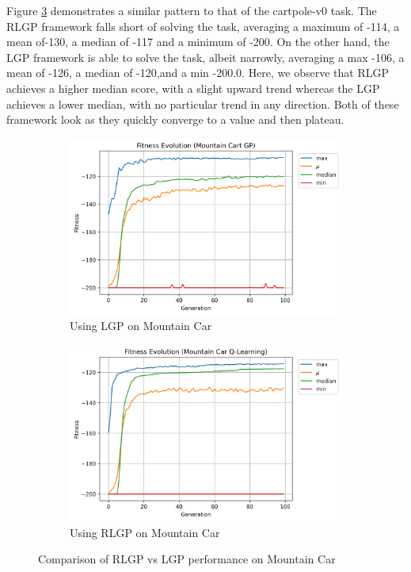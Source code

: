 \documentclass[12pt, final]{dalcsthesis}
\begin{document}
Figure \ref{fig:mountain-car-comparison} demonstrates a similar pattern to that of the cartpole-v0 task. The RLGP framework falls short of solving the task, averaging a maximum of -114, a mean of-130, a median of -117 and a minimum of -200. On the other hand, the LGP framework is able to solve the task, albeit narrowly, averaging a max -106, a mean of -126, a median of -120,and a min -200.0. Here, we observe that RLGP achieves a higher median score, with a slight upward trend whereas the LGP achieves a lower median, with no particular trend in any direction. Both of these framework look as they quickly converge to a value and then plateau.

\begin{figure}[ht]
	\centering
	\begin{subfigure}{1.0\textwidth}
		\includegraphics[width=\linewidth]{mountain_car_lgp.png}
		\caption{Using LGP on Mountain Car}
		\label{fig:mountain-car-lgp}
	\end{subfigure}
	\hfill
	\begin{subfigure}{1.0\textwidth}
		\includegraphics[width=\linewidth]{mountain_car_q.png}
		\caption{Using RLGP on Mountain Car}
		\label{fig:mountain-car-q}
	\end{subfigure}
	\caption{Comparison of RLGP vs LGP performance on Mountain Car}
	\label{fig:mountain-car-comparison}
\end{figure}
\end{document}
